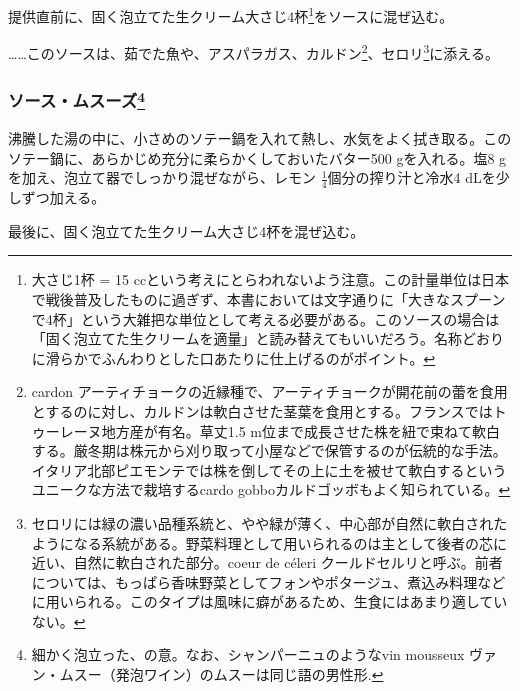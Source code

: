 \begin{recette}
提供直前に、固く泡立てた生クリーム大さじ4杯\footnote{大さじ1杯 = 15
  ccという考えにとらわれないよう注意。この計量単位は日本で戦後普及したものに過ぎず、本書においては文字通りに「大きなスプーンで4杯」という大雑把な単位として考える必要がある。このソースの場合は「固く泡立てた生クリームを適量」と読み替えてもいいだろう。名称どおりに滑らかでふんわりとした口あたりに仕上げるのがポイント。}をソースに混ぜ込む。

\ldots{}\ldots{}このソースは、茹でた魚や、アスパラガス、カルドン\footnote{cardon
  アーティチョークの近縁種で、アーティチョークが開花前の蕾を食用とするのに対し、カルドンは軟白させた茎葉を食用とする。フランスではトゥーレーヌ地方産が有名。草丈1.5
  m位まで成長させた株を紐で束ねて軟白する。厳冬期は株元から刈り取って小屋などで保管するのが伝統的な手法。イタリア北部ピエモンテでは株を倒してその上に土を被せて軟白するというユニークな方法で栽培するcardo
  gobboカルドゴッボもよく知られている。}、セロリ\footnote{セロリには緑の濃い品種系統と、やや緑が薄く、中心部が自然に軟白されたようになる系統がある。野菜料理として用いられるのは主として後者の芯に近い、自然に軟白された部分。coeur
  de céleri
  クールドセルリと呼ぶ。前者については、もっぱら香味野菜としてフォンやポタージュ、煮込み料理などに用いられる。このタイプは風味に癖があるため、生食にはあまり適していない。}に添える。

\atoaki{}

\hypertarget{sauce-mousseuse}{%
\subsubsection[ソース・ムスーズ]{\texorpdfstring{ソース・ムスーズ\footnote{細かく泡立った、の意。なお、シャンパーニュのようなvin
  mousseux ヴァン・ムスー（発泡ワイン）のムスーは同じ語の男性形.}}{ソース・ムスーズ}}\label{sauce-mousseuse}}


 

沸騰した湯の中に、小さめのソテー鍋を入れて熱し、水気をよく拭き取る。このソテー鍋に、あらかじめ充分に柔らかくしておいたバター500
gを入れる。塩8 gを加え、泡立て器でしっかり混ぜながら、レモン
\(\frac{1}{4}\)個分の搾り汁と冷水4 dLを少しずつ加える。

最後に、固く泡立てた生クリーム大さじ4杯を混ぜ込む。


\end{recette}
